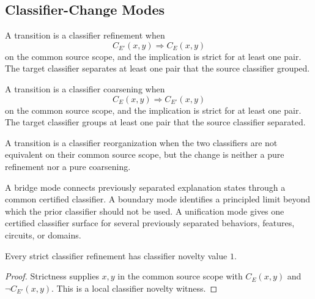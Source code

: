 \subsection{Classifier-Change Modes}
\label{subsec:philosophy-classifier-change-modes}

\begin{definition}
\label{def:philosophy-classifier-refinement}
A transition is a classifier refinement when
$$
C_{E'}(x,y)\Rightarrow C_E(x,y)
$$
on the common source scope, and the implication is strict for at least
one pair. The target classifier separates at least one pair that the
source classifier grouped.
\end{definition}

\begin{definition}
\label{def:philosophy-classifier-coarsening}
A transition is a classifier coarsening when
$$
C_E(x,y)\Rightarrow C_{E'}(x,y)
$$
on the common source scope, and the implication is strict for at least
one pair. The target classifier groups at least one pair that the source
classifier separated.
\end{definition}

\begin{definition}
\label{def:philosophy-classifier-reorganization}
A transition is a classifier reorganization when the two classifiers are
not equivalent on their common source scope, but the change is neither a
pure refinement nor a pure coarsening.
\end{definition}

\begin{definition}
\label{def:philosophy-bridge-boundary-unification-modes}
A bridge mode connects previously separated explanation states through a
common certified classifier. A boundary mode identifies a principled
limit beyond which the prior classifier should not be used. A
unification mode gives one certified classifier surface for several
previously separated behaviors, features, circuits, or domains.
\end{definition}

\begin{theorem}
\label{thm:philosophy-refinement-creates-classifier-novelty}
Every strict classifier refinement has classifier novelty value $1$.
\end{theorem}
\begin{proof}
Strictness supplies $x,y$ in the common source scope with $C_E(x,y)$ and
$\neg C_{E'}(x,y)$. This is a local classifier novelty witness.
\end{proof}

